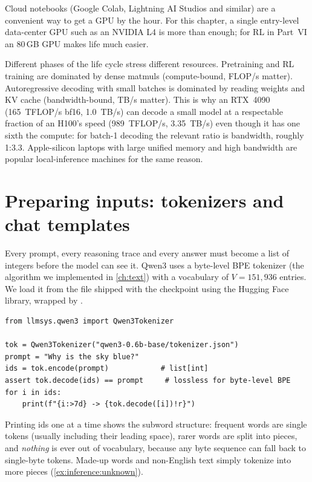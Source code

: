Cloud notebooks (Google Colab, Lightning AI Studios and similar) are a convenient way to get a
GPU by the hour. For this chapter, a single entry-level data-center GPU such as an NVIDIA L4 is
more than enough; for RL in Part~VI an 80\,GB GPU makes life much easier.

\begin{systemslens}
Different phases of the life cycle stress different resources. Pretraining and RL training are
dominated by dense matmuls (compute-bound, FLOP/s matter). Autoregressive decoding with small
batches is dominated by reading weights and KV cache (bandwidth-bound, TB/s matter). This is why
an RTX~4090 (\SI{165}{TFLOP/s} bf16, \SI{1.0}{TB/s}) can decode a small model at a respectable
fraction of an H100's speed (\SI{989}{TFLOP/s}, \SI{3.35}{TB/s}) even though it has one sixth the
compute: for batch-1 decoding the relevant ratio is bandwidth, roughly 1:3.3. Apple-silicon
laptops with large unified memory and high bandwidth are popular local-inference machines for the
same reason.
\end{systemslens}

\section{Preparing inputs: tokenizers and chat templates}\label{sec:inference:tokenizer}

Every prompt, every reasoning trace and every answer must become a list of integers before
the model can see it. Qwen3 uses a byte-level BPE tokenizer (the algorithm we implemented in
\cref{ch:text}) with a vocabulary of $V=151{,}936$ entries. We load it from the
 file shipped with the checkpoint using the Hugging Face 
library, wrapped by .

\begin{lstlisting}[caption={A tokenizer round trip.},label={lst:inference:roundtrip}]
from llmsys.qwen3 import Qwen3Tokenizer

tok = Qwen3Tokenizer("qwen3-0.6b-base/tokenizer.json")
prompt = "Why is the sky blue?"
ids = tok.encode(prompt)            # list[int]
assert tok.decode(ids) == prompt     # lossless for byte-level BPE
for i in ids:
    print(f"{i:>7d} -> {tok.decode([i])!r}")
\end{lstlisting}

Printing ids one at a time shows the subword structure: frequent words are single tokens (usually
including their leading space), rarer words are split into pieces, and \emph{nothing} is ever out of
vocabulary, because any byte sequence can fall back to single-byte tokens. Made-up words and
non-English text simply tokenize into more pieces (\cref{ex:inference:unknown}).

